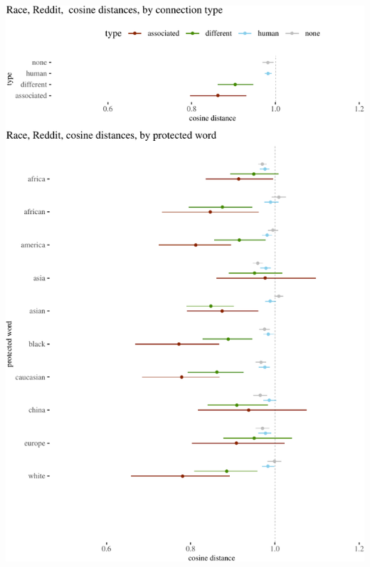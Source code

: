 \documentclass{clv3}
\begin{document}
\begin{center}\includegraphics[width=1\linewidth]{figures/resultsRaceReddita} \end{center}
\end{document}
